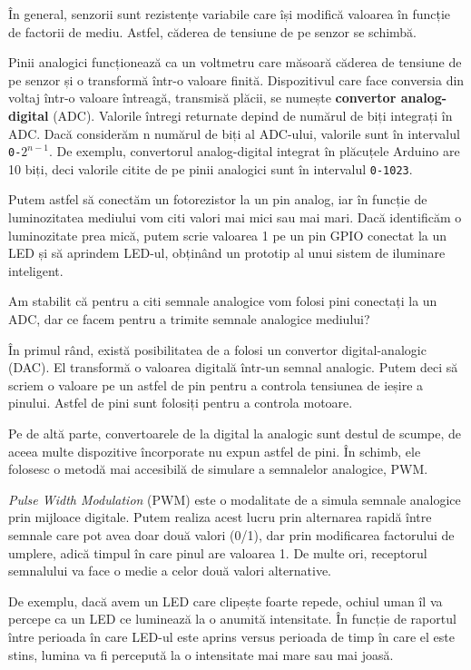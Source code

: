 În general, senzorii sunt rezistențe variabile care își modifică valoarea în funcție de factorii de mediu.
Astfel, căderea de tensiune de pe senzor se schimbă.

Pinii analogici funcționează ca un voltmetru care măsoară căderea de tensiune de pe senzor și o transformă într-o valoare finită.
Dispozitivul care face conversia din voltaj într-o valoare întreagă, transmisă plăcii, se numește \textbf{convertor analog-digital} (ADC).
Valorile întregi returnate depind de numărul de biți integrați în ADC.
Dacă considerăm n numărul de biți al ADC-ului, valorile sunt în intervalul \texttt{0-$2^{n-1}$}.
De exemplu, convertorul analog-digital integrat în plăcuțele Arduino are 10 biți, deci valorile citite de pe pinii analogici sunt în intervalul \texttt{0-1023}.

Putem astfel să conectăm un fotorezistor la un pin analog, iar în funcție de luminozitatea mediului vom citi valori mai mici sau mai mari.
Dacă identificăm o luminozitate prea mică, putem scrie valoarea 1 pe un pin GPIO conectat la un LED și să aprindem LED-ul, obținând un prototip al unui sistem de iluminare inteligent.

Am stabilit că pentru a citi semnale analogice vom folosi pini conectați la un ADC, dar ce facem pentru a trimite semnale analogice mediului?

În primul rând, există posibilitatea de a folosi un convertor digital-analogic (DAC).
El transformă o valoarea digitală într-un semnal analogic.
Putem deci să scriem o valoare pe un astfel de pin pentru a controla tensiunea de ieșire a pinului.
Astfel de pini sunt folosiți pentru a controla motoare.

Pe de altă parte, convertoarele de la digital la analogic sunt destul de scumpe, de aceea multe dispozitive încorporate nu expun astfel de pini.
În schimb, ele folosesc o metodă mai accesibilă de simulare a semnalelor analogice, PWM.

\textit{Pulse Width Modulation} (PWM) este o modalitate de a simula semnale analogice prin mijloace digitale.
Putem realiza acest lucru prin alternarea rapidă între semnale care pot avea doar două valori (0/1), dar prin modificarea factorului de umplere, adică timpul în care pinul are valoarea 1.
De multe ori, receptorul semnalului va face o medie a celor două valori alternative.

De exemplu, dacă avem un LED care clipește foarte repede, ochiul uman îl va percepe ca un LED ce luminează la o anumită intensitate.
În funcție de raportul între perioada în care LED-ul este aprins versus perioada de timp în care el este stins, lumina va fi percepută la o intensitate mai mare sau mai joasă.

